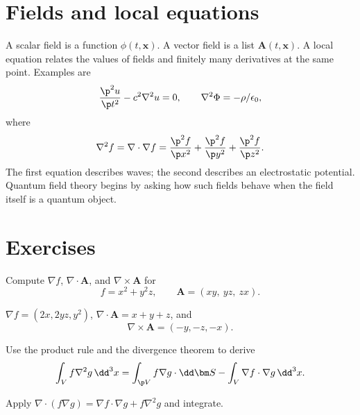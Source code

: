 \section{Fields and local equations}

A scalar field is a function \(\phi(t,\bm x)\).  A vector field is a list \(\bm A(t,\bm x)\).  A local equation relates the values of fields and finitely many derivatives at the same point.  Examples are
\[
  \frac{\p^2 u}{\p t^2}-c^2\nabla^2u=0,
  \qquad
  \nabla^2\Phi=-\rho/\epsilon_0,
\]
where
\[
  \nabla^2 f=\nabla\cdot\nabla f
  =
  \frac{\p^2 f}{\p x^2}
  +\frac{\p^2 f}{\p y^2}
  +\frac{\p^2 f}{\p z^2}.
\]
The first equation describes waves; the second describes an electrostatic potential.  Quantum field theory begins by asking how such fields behave when the field itself is a quantum object.

\section*{Exercises}

\begin{exercise}
Compute \(\nabla f\), \(\nabla\cdot\bm A\), and \(\nabla\times\bm A\) for
\[
f=x^2+y^2z,\qquad
\bm A=(xy,\ yz,\ zx).
\]
\begin{answer}
\(\nabla f=(2x,2yz,y^2)\), \(\nabla\cdot\bm A=x+y+z\), and
\[
\nabla\times\bm A=(-y,-z,-x).
\]
\end{answer}
\end{exercise}

\begin{exercise}
Use the product rule and the divergence theorem to derive
\[
  \int_V f\nabla^2g\,\dd^3x
  =
  \int_{\p V}f\nabla g\cdot\dd\bm S
  -\int_V\nabla f\cdot\nabla g\,\dd^3x.
\]
\begin{answer}
Apply \(\nabla\cdot(f\nabla g)=\nabla f\cdot\nabla g+f\nabla^2g\) and integrate.
\end{answer}
\end{exercise}

